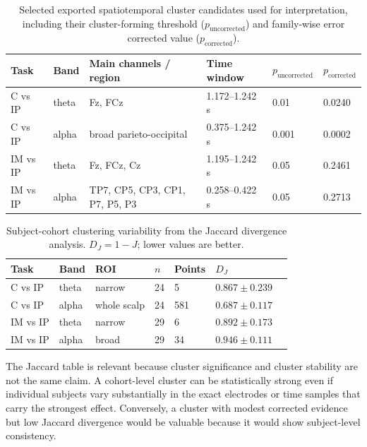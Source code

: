 \documentclass[11pt,a4paper,chapterprefix=false,parskip=false]{scrreprt}
\begin{document}
\begin{table}[H]
    \centering
    \caption{Selected exported spatiotemporal cluster candidates used for interpretation, including their cluster-forming threshold ($p_{\text{uncorrected}}$) and family-wise error corrected value ($p_{\text{corrected}}$).}
    \label{tab:selected-clusters}
    \begin{tabular}{llllll}
        \toprule
        Task     & Band  & Main channels / region         & Time window    & $p_{\text{uncorrected}}$ & $p_{\text{corrected}}$ \\
        \midrule
        C vs IP  & theta & Fz, FCz                        & 1.172--1.242 s & 0.01                     & 0.0240                 \\
        C vs IP  & alpha & broad parieto-occipital        & 0.375--1.242 s & 0.001                    & 0.0002                 \\
        IM vs IP & theta & Fz, FCz, Cz                    & 1.195--1.242 s & 0.05                     & 0.2461                 \\
        IM vs IP & alpha & TP7, CP5, CP3, CP1, P7, P5, P3 & 0.258--0.422 s & 0.05                     & 0.2713                 \\
        \bottomrule
    \end{tabular}
\end{table}

\begin{table}[H]
    \centering
    \small
    \caption{Subject-cohort clustering variability from the Jaccard divergence analysis. $D_J=1-J$; lower values are better.}
    \label{tab:jaccard-variability}
    \begin{tabular}{lllllll}
        \toprule
        Task     & Band  & ROI         & $n$ & Points & $D_J$             \\
        \midrule
        C vs IP  & theta & narrow      & 24  & 5      & $0.867 \pm 0.239$ \\
        C vs IP  & alpha & whole scalp & 24  & 581    & $0.687 \pm 0.117$ \\
        IM vs IP & theta & narrow      & 29  & 6      & $0.892 \pm 0.173$ \\
        IM vs IP & alpha & broad       & 29  & 34     & $0.946 \pm 0.111$ \\
        \bottomrule
    \end{tabular}
\end{table}

The Jaccard table is relevant because cluster significance and cluster stability are not the same claim. A cohort-level cluster can be statistically strong even if individual subjects vary substantially in the exact electrodes or time samples that carry the strongest effect. Conversely, a cluster with modest corrected evidence but low Jaccard divergence would be valuable because it would show subject-level consistency.
\end{document}
